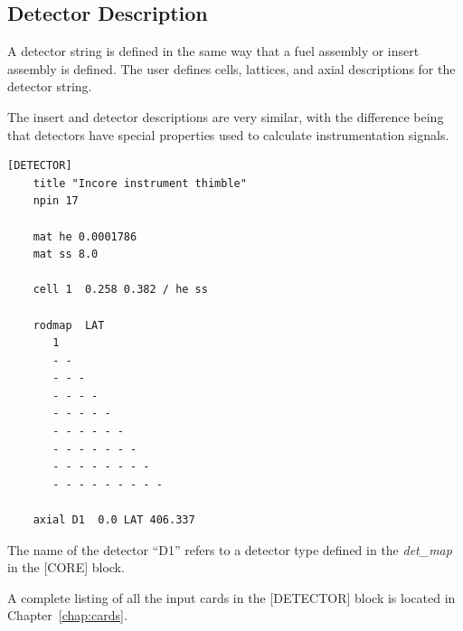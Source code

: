 \subsection{Detector Description}
A detector string is defined in the same way that a fuel assembly or insert assembly is defined.
The user defines cells, lattices, and axial descriptions for the detector string.

The insert and detector descriptions are very similar, with the difference being that
detectors have special properties used to calculate instrumentation signals.

\begin{Verbatim}[fontsize=\small]
  [DETECTOR]
    title "Incore instrument thimble"
    npin 17

    mat he 0.0001786
    mat ss 8.0

    cell 1  0.258 0.382 / he ss

    rodmap  LAT
       1
       - -
       - - -
       - - - -
       - - - - -
       - - - - - -
       - - - - - - -
       - - - - - - - -
       - - - - - - - - -

    axial D1  0.0 LAT 406.337
\end{Verbatim}

The name of the detector ``D1'' refers to a detector type defined in the
{\it det\_map} in the [CORE] block.

A complete listing of all the input cards in the [DETECTOR] block is located in Chapter~\ref{chap:cards}.



